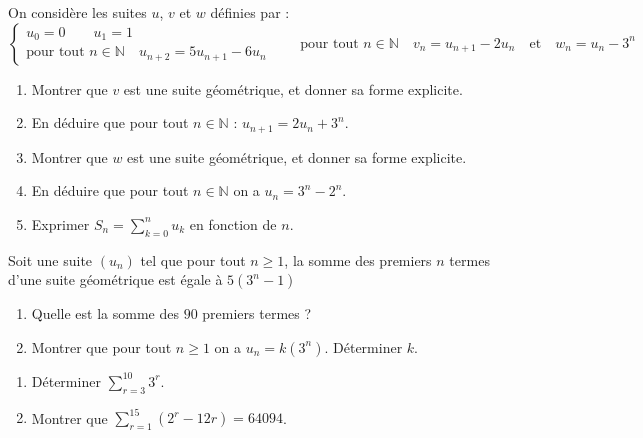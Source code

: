 \documentclass[main.tex]{subfiles}
\begin{document}
\begin{problem} \label{chapter05:exercise:suites52} 
On considère les suites $u$, $v$ et $w$ définies par : 
\setlength{\abovedisplayskip}{3pt}
\setlength{\belowdisplayskip}{3pt}
$$
\begin{cases}
	u_0=0 \qquad u_1=1 \\
	\text{pour tout $n\in\mathbb{N}$} \quad  u_{n+2}=5u_{n+1}-6u_n
\end{cases}
\qquad 
	 \text{pour tout $n\in\mathbb{N}$} \quad  v_n=u_{n+1}-2u_n
	 \quad 
	 \text{et} \quad  w_n=u_{n}-3^{n}
$$ 
\begin{enumerate}[leftmargin=*,label=\arabic*)]
	\item Montrer que $v$ est une suite géométrique, et donner sa forme explicite.
	\item En déduire que pour tout $n\in\mathbb{N}$ : $u_{n+1}=2u_n+3^n$.
	\item Montrer que $w$ est une suite géométrique, et donner sa forme explicite.
	\item En déduire que pour tout $n\in\mathbb{N}$ on a $u_n=3^n-2^n$.
	\item Exprimer $S_n=\sum_{k=0}^{n} u_k$ en fonction de $n$. 
\end{enumerate} 
\end{problem}
\begin{exercise}
Soit une suite $(u_n)$ tel que pour tout $n\geqslant 1$, la somme des premiers $n$ termes d'une suite géométrique est égale à $5(3^n-1)$
\begin{enumerate}[leftmargin=*,label=\arabic*)]
	\item Quelle est la somme des $90$ premiers termes ?
	\item Montrer que pour tout $n\geqslant 1$ on a $u_n=k(3^n)$. Déterminer $k$.
\end{enumerate}
\end{exercise}
\begin{exercise} 
	\begin{enumerate}[leftmargin=*,label=\arabic*)]
		\item Déterminer $\sum_{r=3}^{10}3^r$.
		\item Montrer que $\sum_{r=1}^{15}(2^r-12r)=64094$.
	\end{enumerate}
\end{exercise}
\end{document}
